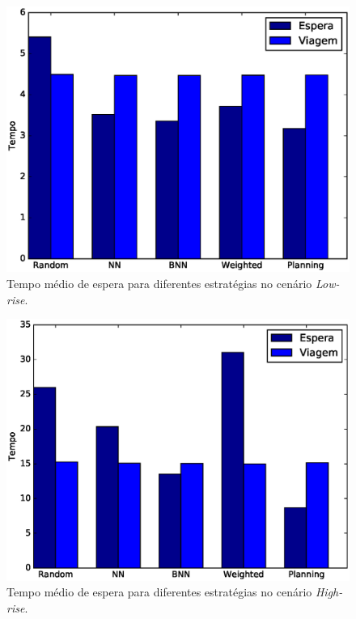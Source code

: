 \begin{figure}[htb]
  \centering
  \includegraphics[scale=0.8]{img/low-rise-average-times-chart}
  \caption[Tempo médio de espera no cenário \textit{Low-rise}.]{Tempo médio de espera para diferentes estratégias no cenário \textit{Low-rise}.}
  \label{fig:result:average:low-rise}
\end{figure}

\begin{figure}[htb]
  \centering
  \includegraphics[scale=0.8]{img/high-rise-average-times-chart}
  \caption[Tempo médio de espera no cenário \textit{High-rise}.]{Tempo médio de espera para diferentes estratégias no cenário \textit{High-rise}.}
  \label{fig:result:average:high-rise}
\end{figure}